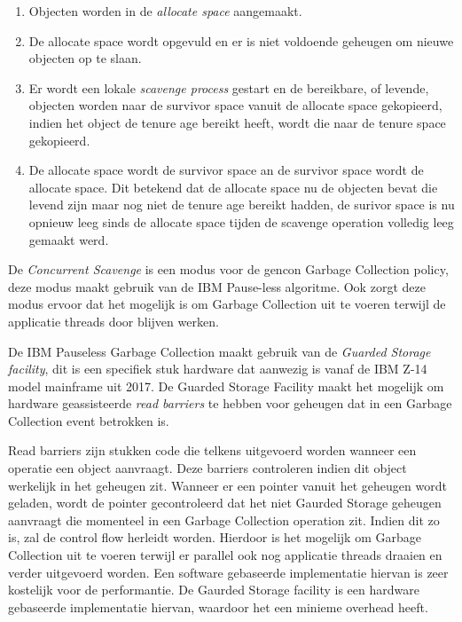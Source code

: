 \begin{enumerate}
    \item Objecten worden in de \textit{allocate space} aangemaakt.
    \item De allocate space wordt opgevuld en er is niet voldoende geheugen om nieuwe objecten op te slaan.
    \item Er wordt een lokale \textit{scavenge process} gestart en de bereikbare, of levende, objecten worden naar de survivor space vanuit de allocate space gekopieerd, indien het object de tenure age bereikt heeft, wordt die naar de tenure space gekopieerd.
    \item De allocate space wordt de survivor space an de survivor space wordt de allocate space.
     Dit betekend dat de allocate space nu de objecten bevat die levend zijn maar nog niet de tenure age bereikt hadden,
     de surivor space is nu opnieuw leeg sinds de allocate space tijden de scavenge operation volledig leeg gemaakt werd.
\end{enumerate}

De \textit{Concurrent Scavenge} is een modus voor de gencon Garbage Collection policy, deze modus maakt gebruik van de IBM Pause-less algoritme. Ook zorgt deze modus ervoor dat het mogelijk is om Garbage Collection uit te voeren terwijl de applicatie threads door blijven werken.


De IBM Pauseless Garbage Collection maakt gebruik van de \textit{Guarded Storage facility}, dit is een specifiek stuk hardware dat aanwezig is vanaf de IBM Z-14 model mainframe uit 2017.
De Guarded Storage Facility maakt het mogelijk om hardware geassisteerde \textit{read barriers} te hebben voor geheugen dat in een Garbage Collection event betrokken is.

Read barriers zijn stukken code die telkens uitgevoerd worden wanneer een operatie een object aanvraagt.
Deze barriers controleren indien dit object werkelijk in het geheugen zit.
Wanneer er een pointer vanuit het geheugen wordt geladen, wordt de pointer gecontroleerd dat het niet Gaurded Storage geheugen aanvraagt die momenteel in een Garbage Collection operation zit.
Indien dit zo is, zal de control flow herleidt worden.
Hierdoor is het mogelijk om Garbage Collection uit te voeren terwijl er parallel ook nog applicatie threads draaien en verder uitgevoerd worden.\autocite{Pinto2017}
Een software gebaseerde implementatie hiervan is zeer kostelijk voor de performantie. \autocite{LloydHosking1998}
De Gaurded Storage facility is een hardware gebaseerde implementatie hiervan, waardoor het een minieme overhead heeft.



